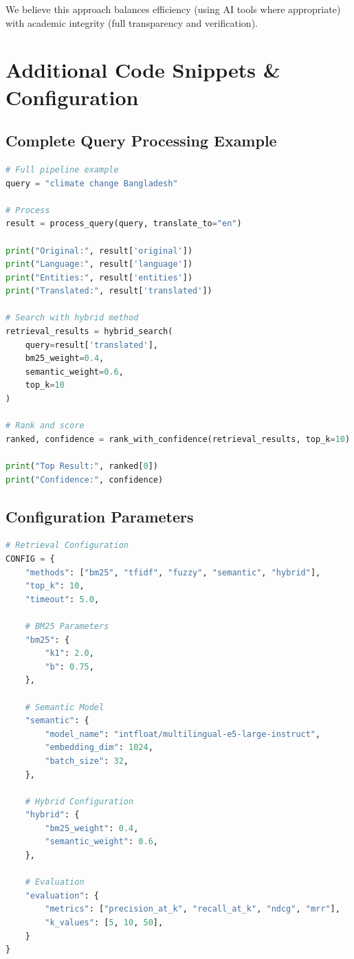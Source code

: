 \documentclass[12pt,a4paper]{report}
\begin{document}
We believe this approach balances efficiency (using AI tools where appropriate) with academic integrity (full transparency and verification).

\newpage

\chapter{Additional Code Snippets \& Configuration}

\section{Complete Query Processing Example}

\begin{lstlisting}[language=Python, caption=End-to-End Query Processing]
# Full pipeline example
query = "climate change Bangladesh"

# Process
result = process_query(query, translate_to="en")

print("Original:", result['original'])
print("Language:", result['language'])
print("Entities:", result['entities'])
print("Translated:", result['translated'])

# Search with hybrid method
retrieval_results = hybrid_search(
    query=result['translated'],
    bm25_weight=0.4,
    semantic_weight=0.6,
    top_k=10
)

# Rank and score
ranked, confidence = rank_with_confidence(retrieval_results, top_k=10)

print("Top Result:", ranked[0])
print("Confidence:", confidence)
\end{lstlisting}

\section{Configuration Parameters}

\begin{lstlisting}[language=Python, caption=System Configuration]
# Retrieval Configuration
CONFIG = {
    "methods": ["bm25", "tfidf", "fuzzy", "semantic", "hybrid"],
    "top_k": 10,
    "timeout": 5.0,
    
    # BM25 Parameters
    "bm25": {
        "k1": 2.0,
        "b": 0.75,
    },
    
    # Semantic Model
    "semantic": {
        "model_name": "intfloat/multilingual-e5-large-instruct",
        "embedding_dim": 1024,
        "batch_size": 32,
    },
    
    # Hybrid Configuration
    "hybrid": {
        "bm25_weight": 0.4,
        "semantic_weight": 0.6,
    },
    
    # Evaluation
    "evaluation": {
        "metrics": ["precision_at_k", "recall_at_k", "ndcg", "mrr"],
        "k_values": [5, 10, 50],
    }
}
\end{lstlisting}
\end{document}
